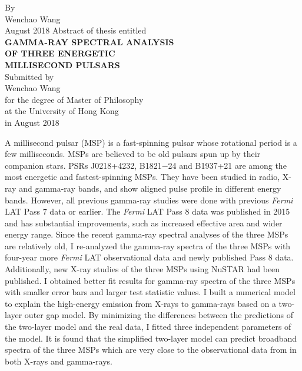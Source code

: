 \documentclass[a4paper, 12pt]{report}
\begin{document}
\begin{titlepage}
\begin{center}
    \large By \\[0.5cm]
    \large Wenchao Wang \\[0.5cm]
    August 2018
    \newpage 
    \centering 
    Abstract of thesis entitled \\[1.2cm]
    \Large \textbf{GAMMA-RAY SPECTRAL ANALYSIS 
    \\[0.5cm] OF THREE ENERGETIC \\ [0.5cm] 
    MILLISECOND PULSARS \\[0.5cm]}
    \normalsize Submitted by \\ [0.5cm]
    \Large Wenchao Wang \\[1cm]
    \normalsize for the degree of Master of Philosophy \\[0.5cm]
    at the University of Hong Kong \\[0.5cm]
    in August 2018 \\[1.9cm]
  \end{center}
    \doublespacing
    \noindent A millisecond pulsar (MSP) is a fast-spinning pulsar whose rotational period is a few 
    milliseconds. MSPs are believed to be old pulsars spun up by their companion stars. PSRs
    J0218+4232, B1821$-$24 and B1937+21 are among the most energetic and fastest-spinning  
    MSPs. They have been studied in radio, X-ray and gamma-ray bands, and show 
    aligned pulse profile in different energy bands. However, all previous gamma-ray studies 
    were done with previous \textit{Fermi} LAT Pass 7 data or earlier. The \textit{Fermi} LAT Pass 8 data was 
    published in 2015 and has substantial improvements, such as increased effective area and 
    wider energy range. Since the recent gamma-ray spectral analyses of the three MSPs are 
    relatively old, I re-analyzed the gamma-ray spectra of the three MSPs with four-year more 
    \textit{Fermi} LAT observational data and newly published Pass 8 data. Additionally, new X-ray 
    studies of the three MSPs using NuSTAR had been published. I obtained better fit results
    for gamma-ray spectra of the three MSPs with smaller error bars and larger test statistic 
    values. I built a numerical model to explain the high-energy emission from X-rays to 
    gamma-rays based on a two-layer outer gap model. By minimizing the differences between 
    the predictions of the two-layer model and the real data, I fitted three independent 
    parameters of the model. It is found that the simplified two-layer model can predict 
    broadband spectra of the three MSPs which are very close to the observational data from 
    in both X-rays and gamma-rays.

\end{titlepage}
\end{document}
